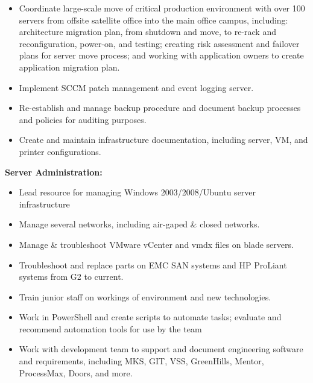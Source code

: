 \documentclass[]{article}
\providecommand{\tightlist}{%
  \setlength{\itemsep}{0pt}\setlength{\parskip}{0pt}}
\begin{document}
\begin{itemize}
\tightlist
\item
  Coordinate large-scale move of critical production environment with
  over 100 servers from offsite satellite office into the main office
  campus, including: architecture migration plan, from shutdown and
  move, to re-rack and reconfiguration, power-on, and testing; creating
  risk assessment and failover plans for server move process; and
  working with application owners to create application migration plan.
\item
  Implement SCCM patch management and event logging server.
\item
  Re-establish and manage backup procedure and document backup processes
  and policies for auditing purposes.
\item
  Create and maintain infrastructure documentation, including server,
  VM, and printer configurations.
\end{itemize}

\textbf{Server Administration:}

\begin{itemize}
\tightlist
\item
  Lead resource for managing Windows 2003/2008/Ubuntu server
  infrastructure
\item
  Manage several networks, including air-gaped \& closed networks.
\item
  Manage \& troubleshoot VMware vCenter and vmdx files on blade servers.
\item
  Troubleshoot and replace parts on EMC SAN systems and HP ProLiant
  systems from G2 to current.
\item
  Train junior staff on workings of environment and new technologies.
\item
  Work in PowerShell and create scripts to automate tasks; evaluate and
  recommend automation tools for use by the team
\item
  Work with development team to support and document engineering
  software and requirements, including MKS, GIT, VSS, GreenHills,
  Mentor, ProcessMax, Doors, and more.
\end{itemize}
\end{document}
